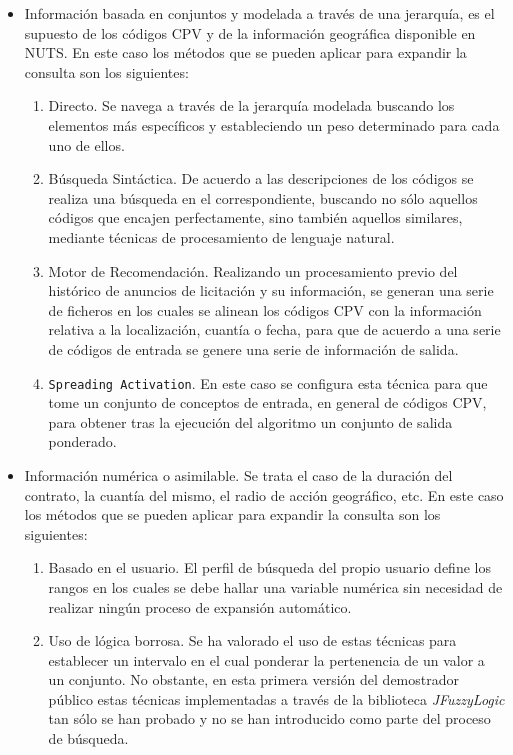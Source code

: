 \begin{itemize}
 \item Información basada en conjuntos y modelada a través de una jerarquía, es el supuesto de los códigos CPV y de la información 
geográfica disponible en NUTS. En este caso los métodos que se pueden aplicar para expandir la consulta son los siguientes:
\begin{enumerate}
 \item Directo. Se navega a través de la jerarquía modelada buscando los elementos más específicos y estableciendo 
un peso determinado para cada uno de ellos. 
 \item Búsqueda Sintáctica. De acuerdo a las descripciones de los códigos se realiza una búsqueda en el \dataset correspondiente, 
buscando no sólo aquellos códigos que encajen perfectamente, sino también aquellos similares, mediante técnicas de procesamiento 
de lenguaje natural.
\item Motor de Recomendación. Realizando un procesamiento previo del histórico de anuncios de licitación y su información, se generan 
una serie de ficheros en los cuales se alinean los códigos CPV con la información relativa a la localización, cuantía o fecha, para que 
de acuerdo a una serie de códigos de entrada se genere una serie de información de salida.
\item \texttt{Spreading Activation}. En este caso se configura esta técnica para que tome un conjunto de conceptos de entrada, en general 
de códigos CPV, para obtener tras la ejecución del algoritmo un conjunto de salida ponderado.
\end{enumerate}

\item Información numérica o asimilable. Se trata el caso de la duración del contrato, la cuantía del mismo, 
el radio de acción geográfico, etc. En este caso los métodos que se pueden aplicar para expandir la consulta son los siguientes:
\begin{enumerate}
\item Basado en el usuario. El perfil de búsqueda del propio usuario define los rangos en los cuales se debe hallar una variable 
numérica sin necesidad de realizar ningún proceso de expansión automático.
\item Uso de lógica borrosa. Se ha valorado el uso de estas técnicas para establecer un intervalo en el cual ponderar 
la pertenencia de un valor a un conjunto. No obstante, en esta primera versión del demostrador público estas técnicas implementadas 
a través de la biblioteca \textit{JFuzzyLogic} tan sólo se han probado y no se han introducido como parte del proceso de 
búsqueda.
\end{enumerate}

\end{itemize}


